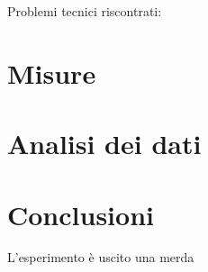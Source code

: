 \documentclass{article}
\begin{document}

Problemi tecnici riscontrati: 

\section{Misure}

\section{Analisi dei dati}

\section{Conclusioni}
L'esperimento è uscito una merda

\section{}
\end{document}
